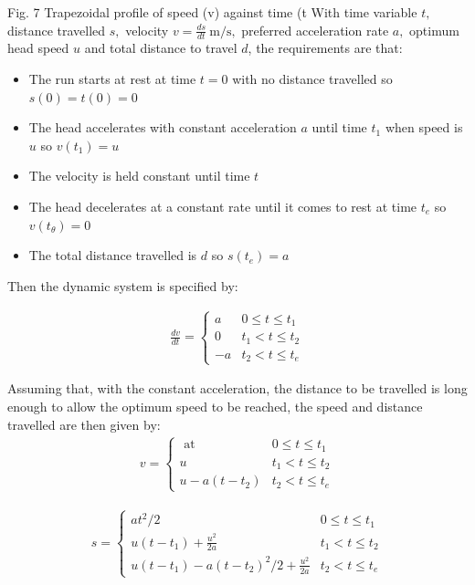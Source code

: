 \documentclass{UoNMCHA}
\numberwithin{equation}{section}
\begin{document}
	Fig. 7 Trapezoidal profile of speed (v) against time (t
	With time variable $t,$ distance travelled $s,$ velocity $v=\frac{d s}{d t} \mathrm{~m} / \mathrm{s},$ preferred acceleration rate $a,$ optimum
	head speed $u$ and total distance to travel $d$, the requirements are that:
	\begin{itemize}
		\item The run starts at rest at time $t=0$ with no distance travelled so $s(0)=t(0)=0$
		\item The head accelerates with constant acceleration $a$ until time $t_{1}$ when speed is $u$ so $v\left(t_{1}\right)=u$
		\item The velocity is held constant until time $t$
		\item The head decelerates at a constant rate until it comes to rest at time $t_{e}$ so $v\left(t_{\theta}\right)=0$
		\item The total distance travelled is $d$ so $s\left(t_{e}\right)=a$
	\end{itemize}

\newpage
	
	Then the dynamic system is specified by:
	
	\begin{align}
		\frac{d v}{d t}=\left\{\begin{array}{cc}
			a & 0 \leq t \leq t_{1} \\
			0 & t_{1}<t \leq t_{2} \\
			-a & t_{2}<t \leq t_{e}
		\end{array}\right.
	\end{align}
	
	
	Assuming that, with the constant acceleration, the distance to be travelled is long enough to allow the
	optimum speed to be reached, the speed and distance travelled are then given by:
	\begin{align}
v=\left\{\begin{array}{cc}
	\text { at } & 0 \leq t \leq t_{1} \\
	u & t_{1}<t \leq t_{2} \\
	u-a\left(t-t_{2}\right) & t_{2}<t \leq t_{e}
\end{array}\right.
\end{align}

		\begin{align}
s=\left\{\begin{array}{cc}
	a t^{2} / 2 & 0 \leq t \leq t_{1} \\
	u\left(t-t_{1}\right)+\frac{u^{2}}{2 a} & t_{1}<t \leq t_{2} \\
	u\left(t-t_{1}\right)-a\left(t-t_{2}\right)^{2} / 2+\frac{u^{2}}{2 a} & t_{2}<t \leq t_{e}
\end{array}\right.
	\end{align}
\end{document}
